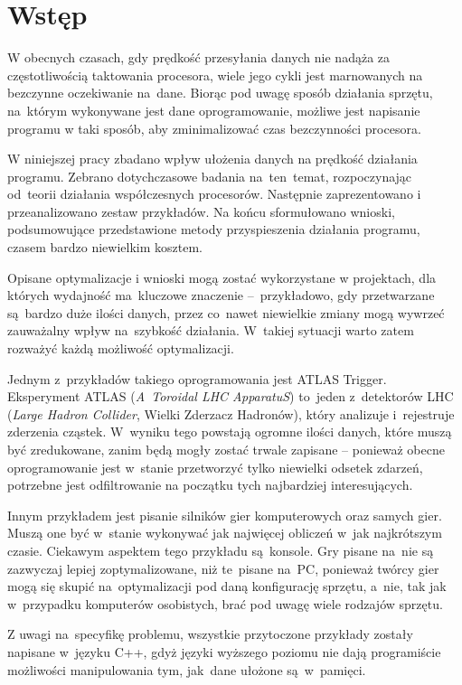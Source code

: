 \chapter{Wstęp}
\label{cha:wstep}

W obecnych czasach, gdy prędkość przesyłania danych nie nadąża za częstotliwością taktowania procesora, wiele jego cykli jest marnowanych na bezczynne oczekiwanie na~dane. Biorąc pod uwagę sposób działania sprzętu, na~którym wykonywane jest dane oprogramowanie, możliwe jest napisanie programu w taki sposób, aby zminimalizować czas bezczynności procesora.


W niniejszej pracy zbadano wpływ ułożenia danych na prędkość działania programu. Zebrano dotychczasowe badania na~ten~temat, rozpoczynając od~teorii działania współczesnych procesorów. Następnie zaprezentowano i przeanalizowano zestaw przykładów. Na końcu sformułowano wnioski, podsumowujące przedstawione metody przyspieszenia działania programu, czasem bardzo niewielkim kosztem.

Opisane optymalizacje i wnioski mogą zostać wykorzystane w projektach, dla których wydajność ma~kluczowe znaczenie --~przykładowo, gdy przetwarzane są~bardzo duże ilości danych, przez co~nawet niewielkie zmiany mogą wywrzeć zauważalny wpływ na~szybkość działania. W~takiej sytuacji warto zatem rozważyć każdą możliwość optymalizacji.

Jednym z~przykładów takiego oprogramowania jest ATLAS Trigger. Eksperyment ATLAS (\textit{A~Toroidal LHC ApparatuS}) to~jeden z~detektorów LHC (\textit{Large Hadron Collider}, Wielki Zderzacz Hadronów), który analizuje i~rejestruje zderzenia cząstek. W~wyniku tego powstają ogromne ilości danych, które muszą być zredukowane, zanim będą mogły zostać trwale zapisane -- ponieważ obecne oprogramowanie jest w~stanie przetworzyć tylko niewielki odsetek zdarzeń, potrzebne jest odfiltrowanie na początku tych najbardziej interesujących.

Innym przykładem jest pisanie silników gier komputerowych oraz samych gier. Muszą one być w~stanie wykonywać jak najwięcej obliczeń w~jak najkrótszym czasie. Ciekawym aspektem tego przykładu są~konsole. Gry pisane na~nie są zazwyczaj lepiej zoptymalizowane, niż te~pisane na~PC, ponieważ twórcy gier mogą się skupić na~optymalizacji pod daną konfigurację sprzętu, a~nie, tak jak w~przypadku komputerów osobistych, brać pod uwagę wiele rodzajów sprzętu.

Z uwagi na~specyfikę problemu, wszystkie przytoczone przykłady zostały napisane w~języku C++, gdyż języki wyższego poziomu nie dają programiście możliwości manipulowania tym, jak~dane ułożone są~w~pamięci.

